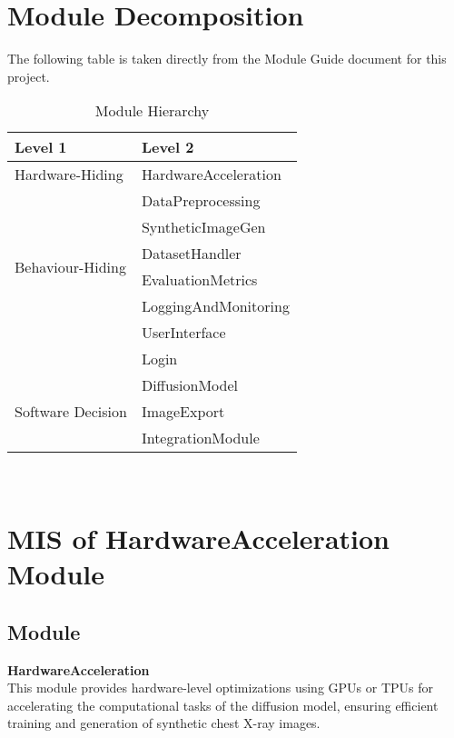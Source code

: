 \documentclass[12pt, titlepage]{article}
\begin{document}
\section{Module Decomposition}

The following table is taken directly from the Module Guide document for this project.

\begin{table}[h!]
\centering
\begin{tabular}{p{} p{}}
\toprule
\textbf{Level 1} & \textbf{Level 2}\\
\midrule

{Hardware-Hiding} & HardwareAcceleration \\
\midrule

\multirow{6}{0.3\textwidth}{Behaviour-Hiding} & DataPreprocessing\\
& SyntheticImageGen\\
& DatasetHandler\\
& EvaluationMetrics\\
& LoggingAndMonitoring\\ 
& UserInterface\\
& Login\\
\midrule

\multirow{3}{0.3\textwidth}{Software Decision} & DiffusionModel\\
& ImageExport\\
& IntegrationModule\\
\bottomrule

\end{tabular}
\caption{Module Hierarchy}
\label{TblMH}
\end{table}

\newpage
~\newpage

\section{MIS of HardwareAcceleration Module} \label{mHardwareAccel}

\subsection{Module}
\textbf{HardwareAcceleration} \\
This module provides hardware-level optimizations using GPUs or TPUs for accelerating the computational tasks of the diffusion model, ensuring efficient training and generation of synthetic chest X-ray images.
\end{document}
